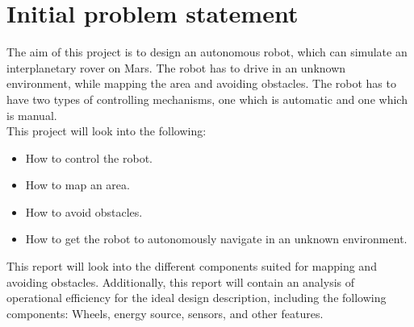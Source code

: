 \chapter{Initial problem statement}

The aim of this project is to design an autonomous robot, which can simulate an interplanetary rover on Mars. The robot has to drive in an unknown environment, while mapping the area and avoiding obstacles. The robot has to have two types of controlling mechanisms, one which is automatic and one which is manual.\\
\newline
This project will look into the following:

\begin{itemize}
\item How to control the robot.
\item How to map an area.
\item How to avoid obstacles.
\item How to get the robot to autonomously navigate in an unknown environment.
\end{itemize}

This report will look into the different components suited for mapping and avoiding obstacles. Additionally, this report will contain an analysis of operational efficiency for the ideal design description, including the following components: Wheels, energy source, sensors, and other features. 









